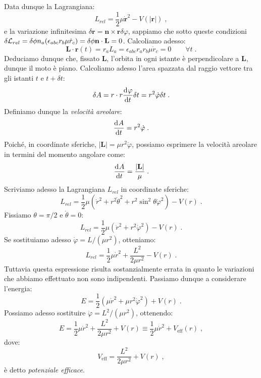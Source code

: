 Data dunque la Lagrangiana:
\begin{equation}
L_{rel}=\frac{1}{2}\mu\dot{\mathbf{r}}^2-V(|\mathbf{r}|)\;,
\end{equation}
e la variazione infinitesima $\delta\mathbf{r}=\mathbf{n}\times\mathbf{r}\delta\varphi$, sappiamo che sotto queste condizioni $\delta\mathcal{L}_{rel}=\delta\phi n_a(\epsilon_{abc}r_b\mu\dot{r}_c)=\delta\phi\mathbf{n}\cdot\mathbf{L}=0$. Calcoliamo adesso:
\begin{equation}
\mathbf{L}\cdot\mathbf{r}(t)=r_aL_a=\epsilon_{abc}r_ar_b\mu\dot{r}_c=0 \qquad \forall t\;.
\end{equation}
Deduciamo dunque che, fissato $\mathbf{L}$, l'orbita in ogni istante è perpendicolare a $\mathbf{L}$, dunque il moto è piano. Calcoliamo adesso l'area spazzata dal raggio vettore tra gli istanti $t$ e $t+\delta t$:
\begin{equation}
\delta A=r\cdot r\frac{\mathrm{d}^{}\varphi}{\mathrm{d}t^{}}\delta t=r^2\dot{\varphi}\delta t\;.
\end{equation}
Definiamo dunque la \textit{velocità areolare}:
\begin{equation}
\frac{\mathrm{d}^{}A}{\mathrm{d}t^{}}=r^2\dot{\varphi}\;.
\end{equation}
Poiché, in coordinate sferiche, $|\mathbf{L}|=\mu r^2\dot{\varphi}$, possiamo esprimere la velocità areolare in termini del momento angolare come:
\begin{equation}
\frac{\mathrm{d}^{}A}{\mathrm{d}t^{}}=\frac{|\mathbf{L}|}{\mu}\;.
\end{equation}
Scriviamo adesso la Lagrangiana $L_{rel}$ in coordinate sferiche:
\begin{equation}
L_{rel}=\frac{1}{2}\mu(\dot{r}^2+r^2\dot{\theta}^2+r^2\sin^2\theta\dot{\varphi}^2)-V(r)\;.
\end{equation}
Fissiamo $\theta=\pi/2$ e $\dot{\theta}=0$:
\begin{equation}
L_{rel}=\frac{1}{2}\mu(\dot{r}^2+r^2\dot{\varphi}^2)-V(r)\;.
\end{equation}
Se sostituiamo adesso $\dot{\varphi}=L/(\mu r^2)$, otteniamo:
\begin{equation}
L_{rel}=\frac{1}{2}\mu\dot{r}^2+\frac{L^2}{2\mu r^2}-V(r)\;.
\end{equation}
Tuttavia questa espressione risulta sostanzialmente errata in quanto le variazioni che abbiamo effettuato non sono indipendenti. Passiamo dunque a considerare l'energia:
\begin{equation}
E=\frac{1}{2}(\mu\dot{r}^2+\mu r^2\dot{\varphi}^2)+V(r)\;.
\end{equation}
Possiamo adesso sostituire $\dot{\varphi}=L^2/(\mu r^2)$, ottenendo:
\begin{equation}
E=\frac{1}{2}\mu\dot{r}^2+\frac{L^2}{2\mu r^2}+V(r)\equiv \frac{1}{2}\mu\dot{r}^2+V_{\mathrm{eff}}(r)\;,
\end{equation}
dove:
\begin{equation}
V_{\mathrm{eff}}=\frac{L^2}{2\mu r^2}+V(r)\;,
\end{equation}
è detto \textit{potenziale efficace}.
